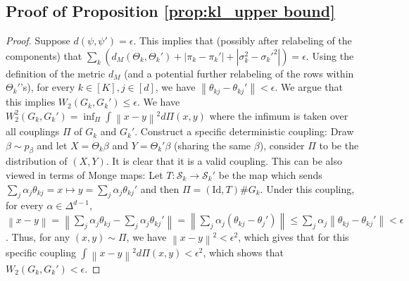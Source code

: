 \documentclass[bj,authoryear]{imsart}
\theoremstyle{plain}
\theoremstyle{remark}
\def\cS{\mathcal{S}}
\def\norm#1{\left\|#1\right\|}
\begin{document}
\begin{appendix}
\subsection{Proof of Proposition \ref{prop:kl_upper bound}}
\label{app:proof_prop:kl_upper bound}
\begin{proof}
    Suppose $d(\psi,\psi')=\epsilon$. This implies that (possibly after relabeling of the components) that 
    $\sum_k \left(d_M(\Theta_k, \Theta_k') + |\pi_k - \pi_k'| + |\sigma_k^2 - \sigma_k'^2|\right) = \epsilon.$
    Using the definition of the metric $d_M$ (and a potential further relabeling of the rows within $\Theta_k'$'s),
    for every $k\in[K], j\in [d]$, we have $\norm{\theta_{kj} - \theta_{kj}'}<\epsilon$. We argue that this implies $W_2(G_k, G_k') \leq \epsilon$. We have $W^2_2(G_k,G_k') = \inf_{\Pi} \int \norm{x-y}^2 d\Pi(x,y)$ where the infimum is taken over all couplings $\Pi$ of $G_k$ and $G_k'$. Construct a specific deterministic coupling: Draw $\beta\sim p_{\beta}$ and let $X=\Theta_k\beta$ and $Y=\Theta_k'\beta$ (sharing the same $\beta$), consider $\Pi$ to be the distribution of $(X,Y)$. It is clear that it is a valid coupling. This can be also viewed in terms of Monge maps: Let $T:\cS_k \to \cS_k'$ be the map which sends $\sum_j \alpha_j \theta_{kj} = x\mapsto y=\sum_j \alpha_j \theta_{kj}'$ and then $\Pi = (\text{Id}, T) \# G_k$. Under this coupling, for every $\alpha\in \Delta^{d-1}$, $\norm{x-y} = \norm{\sum_j \alpha_j \theta_{kj} - \sum_j \alpha_j \theta_{kj}'} = \norm{\sum_j \alpha_j (\theta_{kj} - \theta_j')}\leq \sum_j \alpha_j \norm{\theta_{kj} - \theta_{kj}'} < \epsilon$. Thus, for any $(x,y)\sim \Pi$, we have $\norm{x-y}^2 < \epsilon^2$, which gives that for this specific coupling $\int \norm{x-y}^2d\Pi (x,y) < \epsilon^2$, which shows that $W_2(G_k, G_k') < \epsilon$.


\end{proof}
\end{appendix}
\end{document}
